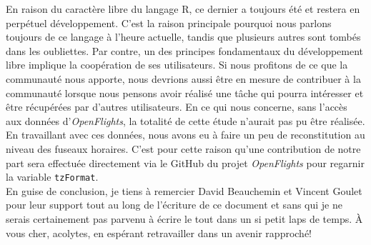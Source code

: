 En raison du caractère libre du langage R, ce dernier a toujours été et restera en perpétuel développement. C'est la raison principale pourquoi nous parlons toujours de ce langage à l'heure actuelle, tandis que plusieurs autres sont tombés dans les oubliettes. Par contre, un des principes fondamentaux du développement libre implique la coopération de ses utilisateurs. Si nous profitons de ce que la communauté nous apporte, nous devrions aussi être en mesure de contribuer à la communauté lorsque nous pensons avoir réalisé une tâche qui pourra intéresser et être récupérées par d'autres utilisateurs. En ce qui nous concerne, sans l'accès aux données d'\emph{OpenFlights}, la totalité de cette étude n'aurait pas pu être réalisée. En travaillant avec ces données, nous avons eu à faire un peu de reconstitution au niveau des fuseaux horaires. C'est pour cette raison qu'une contribution de notre part sera effectuée directement via le GitHub du projet \emph{OpenFlights} pour regarnir la variable \texttt{tzFormat}. \\

En guise de conclusion, je tiens à remercier David Beauchemin et Vincent Goulet pour leur support tout au long de l'écriture de ce document et sans qui je ne serais certainement pas parvenu à écrire le tout dans un si petit laps de temps. À vous cher, acolytes, en espérant retravailler dans un avenir rapproché!
